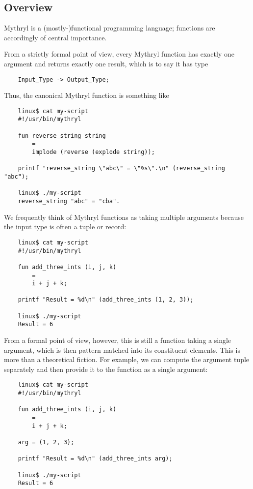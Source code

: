 
\subsection{Overview}
\label{section:ref:functions:overview}

Mythryl is a (mostly-)functional programming language;
functions are accordingly of central importance.

From a strictly formal point of view, every Mythryl 
function has exactly one argument and returns exactly 
one result, which is to say it has type

\begin{verbatim}
    Input_Type -> Output_Type;
\end{verbatim}

Thus, the canonical Mythryl function is something like

\begin{verbatim}
    linux$ cat my-script
    #!/usr/bin/mythryl

    fun reverse_string string
        =
        implode (reverse (explode string));

    printf "reverse_string \"abc\" = \"%s\".\n" (reverse_string "abc");

    linux$ ./my-script
    reverse_string "abc" = "cba".
\end{verbatim}

We frequently think of Mythryl functions as taking multiple 
arguments because the input type is often a tuple or record:

\begin{verbatim}
    linux$ cat my-script
    #!/usr/bin/mythryl

    fun add_three_ints (i, j, k)
        =
        i + j + k;

    printf "Result = %d\n" (add_three_ints (1, 2, 3));

    linux$ ./my-script
    Result = 6
\end{verbatim}

From a formal point of view, however, this is still a function 
taking a single argument, which is then pattern-matched into 
its constituent elements.  This is more than a theoretical 
fiction.  For example, we can compute the argument tuple 
separately and then provide it to the function as a single argument: 

\begin{verbatim}
    linux$ cat my-script
    #!/usr/bin/mythryl

    fun add_three_ints (i, j, k)
        =
        i + j + k;

    arg = (1, 2, 3);

    printf "Result = %d\n" (add_three_ints arg);

    linux$ ./my-script
    Result = 6
\end{verbatim}

